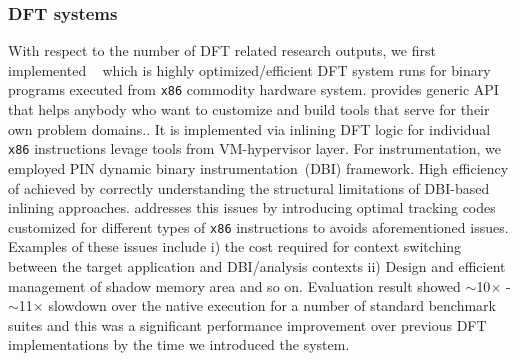 \documentclass[letterpaper, 10pt]{article}
\begin{document}
\begin{small}
\subsubsection*{DFT systems} 

With respect to the number of DFT related research outputs, we first
implemented \libdft~\cite{libdft:2012vee} which is highly optimized/efficient
DFT system runs for binary programs executed from {\tt x86} commodity hardware
system. \libdft provides generic API that helps anybody who want to customize
and build tools that serve for their own problem domains..
%
It is implemented via inlining DFT logic for individual {\tt x86} instructions
 levage tools from VM-hypervisor layer. For
instrumentation, we employed PIN dynamic binary instrumentation~(DBI)
framework. High efficiency of \libdft achieved by correctly understanding the
structural limitations of DBI-based inlining approaches. \libdft addresses this
issues by introducing optimal tracking codes customized for different types of
{\tt x86} instructions to avoids aforementioned issues. Examples of these
issues include i) the cost required for context switching between the target
application and DBI/analysis contexts ii) Design and efficient management of
shadow memory area and so on. 
%
Evaluation result showed $\sim$10$\times$ - $\sim$11$\times$ slowdown over the
native execution for a number of standard benchmark suites and this was a
significant performance improvement over previous DFT implementations by the
time we introduced the system.


\end{small}
\end{document}

